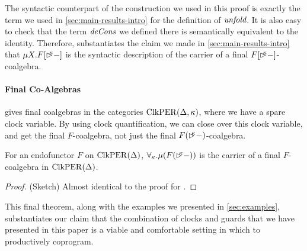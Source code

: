 The syntactic counterpart of the construction we used in this proof is
exactly the term we used in \autoref{sec:main-results-intro} for the
definition of $\textit{unfold}$. It is also easy to check that the term
$\textit{deCons}$ we defined there is semantically equivalent to the
identity. Therefore,  substantiates
the claim we made in \autoref{sec:main-results-intro} that $\mu
X. F[\mathord{\rhd\kern-0.4em^{\kappa}}-]$ is the syntactic description of the carrier of a
final $F[\mathord{\rhd\kern-0.4em^{\kappa}}-]$-coalgebra.

\paragraph{Final Co-Algebras}  gives
final coalgebras in the categories $\mathrm{ClkPER}(\Delta, \kappa)$, where we
have a spare clock variable. By using clock quantification, we can
close over this clock variable, and get the final
$F$-coalgebra, not just the final $F(\mathord{\rhd\kern-0.4em^{\kappa}}-)$-coalgebra.

\begin{theorem}\label{thm:final-f-coalgebra}
  For an endofunctor $F$ on $\mathrm{ClkPER}(\Delta)$, $\forall_\kappa. \mu
  (F(\mathord{\rhd\kern-0.4em^{\kappa}}-))$ is the carrier of a final $F$-coalgebra in
  $\mathrm{ClkPER}(\Delta)$.
\end{theorem}

\begin{proof}
  (Sketch) Almost identical to the proof for
  .
\end{proof}

This final theorem, along with the examples we presented in
\autoref{sec:examples}, substantiates our claim that the combination
of clocks and guards that we have presented in this paper is a viable
and comfortable setting in which to productively coprogram.

